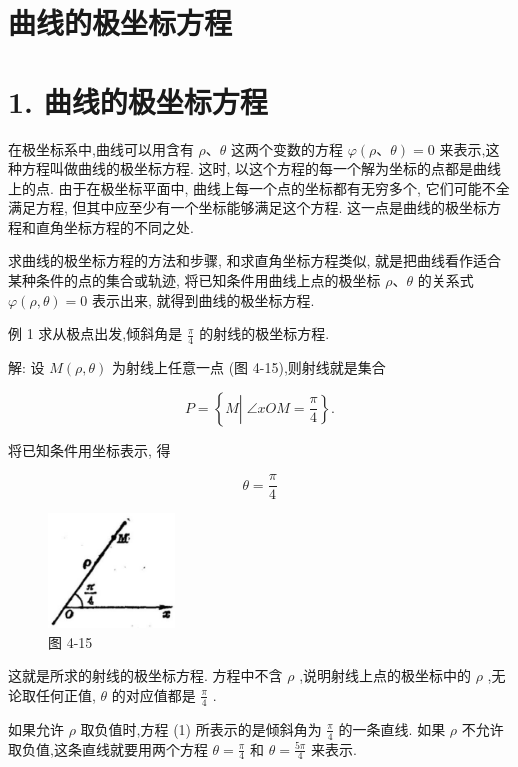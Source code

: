 \documentclass[lang=cn,newtx,10pt,scheme=chinese]{elegantbook}
\begin{document}
\section{曲线的极坐标方程}

\section*{1. 曲线的极坐标方程}

在极坐标系中,曲线可以用含有 \(\rho \text{、}\theta\) 这两个变数的方程 \(\varphi \left( {\rho \text{、}\theta }\right) = 0\) 来表示,这种方程叫做曲线的极坐标方程. 这时, 以这个方程的每一个解为坐标的点都是曲线上的点. 由于在极坐标平面中, 曲线上每一个点的坐标都有无穷多个, 它们可能不全满足方程, 但其中应至少有一个坐标能够满足这个方程. 这一点是曲线的极坐标方程和直角坐标方程的不同之处.

求曲线的极坐标方程的方法和步骤, 和求直角坐标方程类似, 就是把曲线看作适合某种条件的点的集合或轨迹, 将已知条件用曲线上点的极坐标 \(\rho \text{、}\theta\) 的关系式 \(\varphi \left( {\rho ,\theta }\right) = 0\) 表示出来, 就得到曲线的极坐标方程.

例 1 求从极点出发,倾斜角是 \(\frac{\pi }{4}\) 的射线的极坐标方程.

解: 设 \(M\left( {\rho ,\theta }\right)\) 为射线上任意一点 (图 4-15),则射线就是集合

\[
  P = \left\{ {M\left| {\;\angle {xOM} = \frac{\pi }{4}}\right. }\right\} .
\]

将已知条件用坐标表示, 得

\[
  \theta = \frac{\pi }{4} \tag{1}
\]

\begin{figure}[h]
  \centering
  \includegraphics[max width=0.3\textwidth]{images/01912cc2-ffb6-728e-9ae7-b113ff05c64b_178_107936.jpg}
  \caption{图 4-15}
\end{figure}



这就是所求的射线的极坐标方程. 方程中不含 \(\rho\) ,说明射线上点的极坐标中的 \(\rho\) ,无论取任何正值, \(\theta\) 的对应值都是 \(\frac{\pi }{4}\) .

如果允许 \(\rho\) 取负值时,方程 (1) 所表示的是倾斜角为 \(\frac{\pi }{4}\) 的一条直线. 如果 \(\rho\) 不允许取负值,这条直线就要用两个方程 \(\theta = \frac{\pi }{4}\) 和 \(\theta = \frac{5\pi }{4}\) 来表示.
\end{document}
